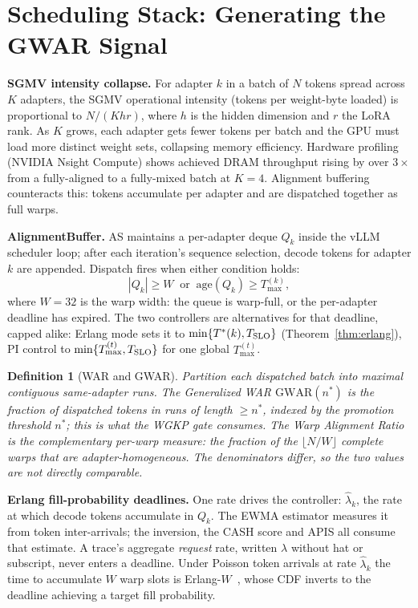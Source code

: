 \documentclass[conference]{IEEEtran}
\newtheorem{definition}{Definition}
\newcommand{\asys}{AS\xspace}
\newcommand{\gwar}[1]{\ensuremath{\mathrm{GWAR}(#1)}\xspace}
\begin{document}
\section{Scheduling Stack: Generating the GWAR Signal}
\label{sec:buffer}

\textbf{SGMV intensity collapse.}
For adapter $k$ in a batch of $N$ tokens spread across $K$ adapters, the
SGMV operational intensity (tokens per weight-byte loaded) is proportional
to $N/(Khr)$, where $h$ is the hidden dimension and $r$ the LoRA rank.
As $K$ grows, each adapter gets fewer tokens per batch and the GPU must load
more distinct weight sets, collapsing memory efficiency.
Hardware profiling (NVIDIA Nsight Compute) shows achieved
DRAM throughput rising by over $3\times$ from a fully-aligned to a fully-mixed
batch at $K{=}4$.
Alignment buffering counteracts this: tokens accumulate per adapter and are
dispatched together as full warps.

\textbf{AlignmentBuffer.}
\asys maintains a per-adapter deque $Q_k$ inside the vLLM scheduler loop; after
each iteration's sequence selection, decode tokens for adapter $k$ are appended.
Dispatch fires when either condition holds:
\begin{equation}
|Q_k| \geq W \;\;\text{or}\;\; \mathrm{age}(Q_k) \geq T_{\max}^{(k)},
\label{eq:dispatch}
\end{equation}
where $W{=}32$ is the warp width: the queue is warp-full, or the per-adapter
deadline has expired.
The two controllers are alternatives for that deadline, capped alike: Erlang
mode sets it to $\min\{T^*(k),T_{\rm SLO}\}$ (Theorem~\ref{thm:erlang}), PI
control to $\min\{T_{\max}^{(t)},T_{\rm SLO}\}$ for one global $T_{\max}^{(t)}$.

\begin{definition}[WAR and GWAR]
\label{def:war}
Partition each dispatched batch into maximal contiguous same-adapter runs.
The Generalized WAR $\gwar{n^*}$ is the fraction of dispatched \emph{tokens} in
runs of length ${\geq}n^*$, indexed by the promotion threshold $n^*$; this is
what the WGKP gate consumes.  The Warp Alignment Ratio is the complementary
\emph{per-warp} measure: the fraction of the $\lfloor N/W\rfloor$ complete warps
that are adapter-homogeneous.  The denominators differ, so the two values are
not directly comparable.
\end{definition}

\textbf{Erlang fill-probability deadlines.}
One rate drives the controller: $\hat\lambda_k$, the rate at which decode tokens
accumulate in $Q_k$.  The EWMA estimator measures it from token inter-arrivals;
the inversion, the CASH score and APIS all consume that estimate.  A trace's aggregate \emph{request} rate, written
$\lambda$ without hat or subscript, never enters a deadline.
Under Poisson token arrivals at rate $\hat\lambda_k$ the time to accumulate $W$
warp slots is Erlang-$W$~\cite{erlang1917theory,kleinrock1975queueing}, whose CDF
inverts to the deadline achieving a target fill probability.
\end{document}
